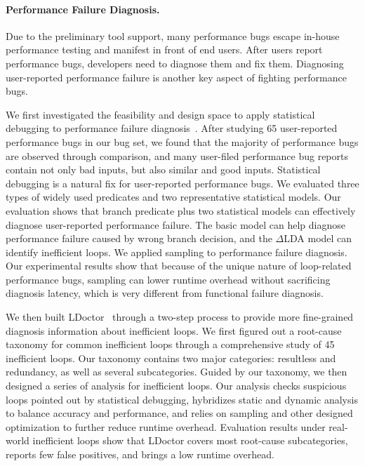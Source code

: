 \documentclass[10pt]{article}
\begin{document}
\vspace{-.1in}
\paragraph{Performance Failure Diagnosis.}
Due to the preliminary tool support, many performance bugs escape in-house performance testing and manifest in front of end users. 
After users report performance bugs, developers need to diagnose them and fix them.
Diagnosing user-reported performance failure is another key aspect of fighting performance bugs. 

%
We first investigated the feasibility and design space to apply statistical debugging to performance failure diagnosis~\cite{Song14OOPSLA}. 
After studying 65 user-reported performance bugs in our bug set, 
we found that the majority of performance bugs are observed through comparison, 
and many user-filed performance bug reports contain not only bad inputs, but also similar and good inputs. 
Statistical debugging is a natural fix for user-reported performance bugs. 
We evaluated three types of widely used predicates and two representative statistical models. 
Our evaluation shows that branch predicate plus two statistical models can effectively diagnose user-reported performance failure. 
The basic model can help diagnose performance failure caused by wrong branch decision, and the $\Delta$LDA model can identify inefficient loops.  
We applied sampling to performance failure diagnosis. Our experimental results show that
because of the unique nature of loop-related performance bugs, sampling can lower runtime overhead without sacrificing diagnosis latency, 
which is very different from functional failure diagnosis.

We then built LDoctor~\cite{Song17ICSE} through a two-step process to provide more fine-grained diagnosis information about inefficient loops. 
We first figured out a root-cause taxonomy for common inefficient loops through a comprehensive study of 45 inefficient loops. 
Our taxonomy contains two major categories: resultless and redundancy, as well as several subcategories. 
Guided by our taxonomy, we then designed a series of analysis for inefficient loops. 
Our analysis 
checks suspicious loops pointed out by statistical debugging, 
hybridizes static and dynamic analysis to balance accuracy and performance, 
and relies on sampling and other designed optimization to further reduce runtime overhead. 
Evaluation results under real-world inefficient loops show that LDoctor covers most root-cause subcategories, 
reports few false positives, and brings a low runtime overhead. 
\end{document}
